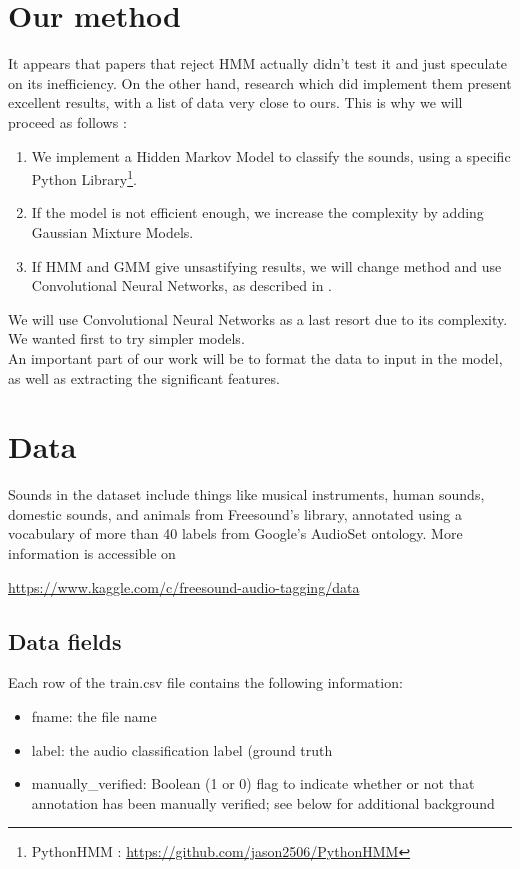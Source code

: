 \documentclass{article} %
\begin{document}
\section{Our method}
	It appears that papers that reject HMM actually didn't test it and just speculate on its inefficiency. On the other hand, research which did implement them \cite{3} \cite{4} present excellent results, with a list of data very close to ours. This is why we will proceed as follows :
	\begin{enumerate}
		\item We implement a Hidden Markov Model to classify the sounds, using a specific Python Library\footnote{PythonHMM : \url{https://github.com/jason2506/PythonHMM}}.
		\item If the model is not efficient enough, we increase the complexity by adding Gaussian Mixture Models.
		\item If HMM and GMM give unsastifying results, we will change method and use Convolutional Neural Networks, as described in \cite{cite2}.
	\end{enumerate}
	We will use Convolutional Neural Networks as a last resort due to its complexity. We wanted first to try simpler models.\\
	\newline
	An important part of our work will be to format the data to input in the model, as well as extracting the significant features.

\section{Data}
	Sounds in the dataset include things like musical instruments, human sounds, domestic sounds, and animals from Freesound’s library, annotated using a vocabulary of more than 40 labels from Google’s AudioSet ontology. 
	More information is accessible on 
	\begin{center} 
	\url{https://www.kaggle.com/c/freesound-audio-tagging/data}
	\end{center}

	\subsection{Data fields}
		Each row of the train.csv file contains the following information:
			\begin{itemize}
			    \item fname: the file name
			    \item label: the audio classification label (ground truth
			    \item manually\_verified: Boolean (1 or 0) flag to indicate whether or not that annotation has been manually verified; see below for additional background
			\end{itemize}
\end{document}
